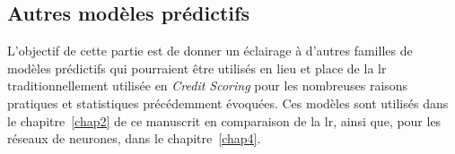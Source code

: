 \subsection{Autres modèles prédictifs}

L'objectif de cette partie est de donner un éclairage à d'autres familles de modèles prédictifs qui pourraient être utilisés en lieu et place de la \gls{lr} traditionnellement utilisée en \textit{Credit Scoring} pour les nombreuses raisons pratiques et statistiques précédemment évoquées. Ces modèles sont utilisés dans le chapitre~\ref{chap2} de ce manuscrit en comparaison de la \gls{lr}, ainsi que, pour les réseaux de neurones, dans le chapitre~\ref{chap4}.

%
%
%
%
%
